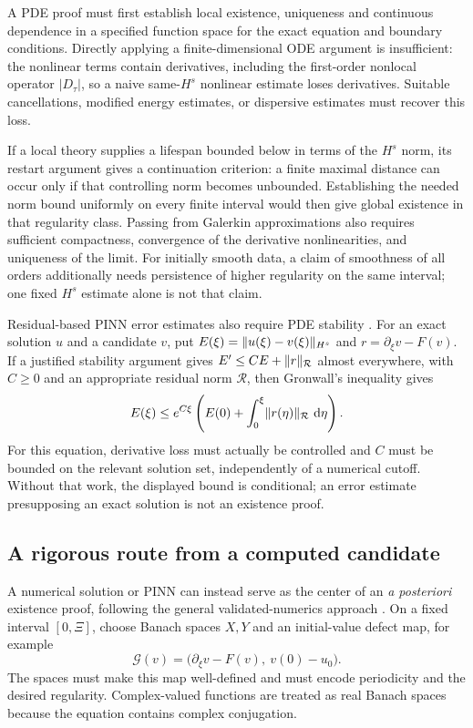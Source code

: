 A PDE proof must first establish local existence, uniqueness and
continuous dependence in a specified function space for the exact
equation and boundary conditions. Directly applying a finite-dimensional
ODE argument is insufficient: the nonlinear terms contain derivatives,
including the first-order nonlocal operator $|D_\tau|$, so a naive
same-$H^s$ nonlinear estimate loses derivatives. Suitable cancellations,
modified energy estimates, or dispersive estimates must recover this loss.

If a local theory supplies a lifespan bounded below in terms of the
$H^s$ norm, its restart argument gives a continuation criterion: a finite
maximal distance can occur only if that controlling norm becomes
unbounded. Establishing the needed norm bound uniformly on every finite
interval would then give global existence in that regularity class.
Passing from Galerkin approximations also requires sufficient compactness,
convergence of the derivative nonlinearities, and uniqueness of the limit.
For initially smooth data, a claim of smoothness of all orders additionally
needs persistence of higher regularity on the same interval; one fixed
$H^s$ estimate alone is not that claim.

Residual-based PINN error estimates also require PDE stability
\cite{mishra,bai}. For an exact solution $u$ and a candidate $v$, put
$E(\xi)=\lVert u(\xi)-v(\xi)\rVert_{H^s}$ and
$r=\partial_\xi v-F(v)$. If a justified stability argument gives
$E'\leq CE+\lVert r\rVert_{\mathcal R}$ almost everywhere, with $C\geq0$ and
an appropriate residual norm $\mathcal R$, then Gronwall's inequality gives
\[
 E(\xi)\leq e^{C\xi}\left(E(0)+
              \int_0^\xi\lVert r(\eta)\rVert_{\mathcal R}\,\,\mathrm d\eta\right).
\]
For this equation, derivative loss must actually be controlled and $C$
must be bounded on the relevant solution set, independently of a numerical
cutoff. Without that work, the displayed bound is conditional; an error
estimate presupposing an exact solution is not an existence proof.

\subsection{A rigorous route from a computed candidate}

A numerical solution or PINN can instead serve as the center of an
\emph{a posteriori} existence proof, following the general validated-numerics
approach \cite{validation}. On a fixed interval $[0,\Xi]$, choose
Banach spaces $X,Y$ and an initial-value defect map, for example
\[
 \mathcal G(v)=\bigl(\partial_\xi v-F(v),\ v(0)-u_0\bigr).
\]
The spaces must make this map well-defined and must encode periodicity
and the desired regularity. Complex-valued functions are treated as real
Banach spaces because the equation contains complex conjugation.

